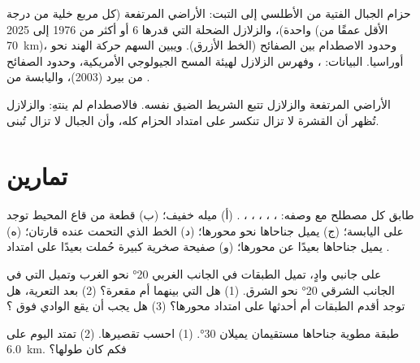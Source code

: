 \begin{omfigure}
{\small حزام الجبال الفتية من الأطلسي إلى التبت: الأراضي المرتفعة
(كل مربع خلية من درجة واحدة)، والزلازل الضحلة التي قدرها 6 أو أكثر
من 1976 إلى 2025 (الأقل عمقًا من \qty{70}{km})، وحدود
الاصطدام بين الصفائح (الخط الأزرق). ويبين السهم حركة الهند
نحو أوراسيا. البيانات: ، وفهرس الزلازل لهيئة المسح الجيولوجي الأمريكية، وحدود الصفائح من
بيرد (2003)، واليابسة من .}
\end{omfigure}

الأراضي المرتفعة والزلازل تتبع الشريط الضيق نفسه. فالاصطدام
لم ينتهِ: والزلازل تُظهر أن القشرة لا تزال تنكسر
على امتداد الحزام كله، وأن الجبال لا تزال تُبنى.

\section{تمارين}

\begin{exercise}[$\star$]\label{exo:g12:mountain-building:1}
طابق كل مصطلح مع وصفه: ، ، ، ،
، . (أ)  ميله خفيف؛ (ب) قطعة من
قاع المحيط توجد على اليابسة؛ (ج)  يميل جناحاها نحو محورها؛
(د) الخط الذي التحمت عنده قارتان؛ (ه)  يميل جناحاها
بعيدًا عن محورها؛ (و) صفيحة صخرية كبيرة حُملت بعيدًا على امتداد .
\end{exercise}

\begin{exercise}[$\star$]\label{exo:g12:mountain-building:2}
على جانبي وادٍ، تميل الطبقات في الجانب الغربي \ang{20} نحو الغرب
وتميل التي في الجانب الشرقي \ang{20} نحو الشرق. (1) هل  التي بينهما
 أم مقعرة؟ (2) بعد التعرية، هل توجد أقدم الطبقات أم أحدثها
على امتداد محورها؟ (3) هل يجب أن يقع الوادي فوق ؟
\end{exercise}

\begin{exercise}[$\star$]\label{exo:g12:mountain-building:3}
طبقة مطوية جناحاها مستقيمان يميلان \ang{30}. (1) احسب
تقصيرها. (2) تمتد اليوم على \qty{6.0}{km}. فكم كان طولها؟
\end{exercise}

